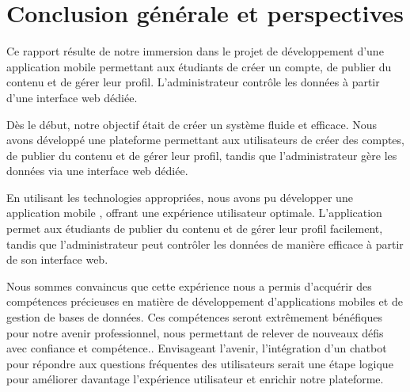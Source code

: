 \chapter*{Conclusion générale et perspectives}
\adjustmtc
\begin{sloppypar} 
\thispagestyle{MyStyle}
Ce rapport résulte de notre immersion dans le projet de développement d'une application mobile permettant aux étudiants de créer un compte, de publier du contenu et de gérer leur profil. L'administrateur contrôle les données à partir d'une interface web dédiée.

Dès le début, notre objectif était de créer un système fluide et efficace. Nous avons développé une plateforme permettant aux utilisateurs de créer des comptes, de publier du contenu et de gérer leur profil, tandis que l'administrateur gère les données via une interface web dédiée.

En utilisant les technologies appropriées, nous avons pu développer une application mobile , offrant une expérience utilisateur optimale. L'application permet aux étudiants de publier du contenu et de gérer leur profil facilement, tandis que l'administrateur peut contrôler les données de manière efficace à partir de son interface web.

Nous sommes convaincus que cette expérience nous a permis d'acquérir des compétences précieuses en matière de développement d'applications mobiles et de gestion de bases de données. Ces compétences seront extrêmement bénéfiques pour notre avenir professionnel, nous permettant de relever de nouveaux défis avec confiance et compétence.. Envisageant l'avenir, l'intégration d'un chatbot pour répondre aux questions fréquentes des utilisateurs serait une étape logique pour améliorer davantage l'expérience utilisateur et enrichir notre plateforme.


\end{sloppypar}




























